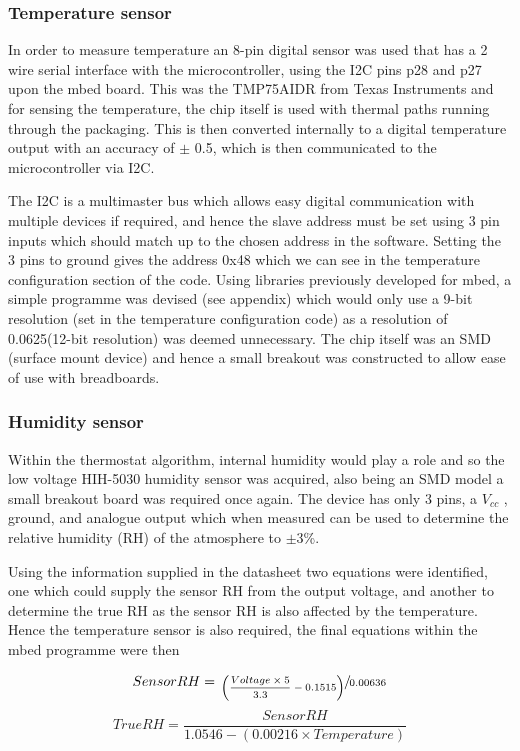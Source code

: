 \documentclass[10.5pt,a4paper,twoside]{report}   %
\begin{document}
\subsubsection{Temperature sensor}
In order to measure temperature an 8-pin digital sensor was used that has a 2 wire serial interface with the microcontroller, using the I2C pins p28 and p27 upon the mbed board. This was the TMP75AIDR from Texas Instruments and for sensing the temperature, the chip itself is used with thermal paths running through the packaging. This is then converted internally to a digital temperature output with an accuracy of $\pm$ 0.5\celsius, which is then communicated to the microcontroller via I2C. 

The I2C is a multimaster bus which allows easy digital communication with multiple devices if required, and hence the slave address must be set using 3 pin inputs which should match up to the chosen address in the software. Setting the 3 pins to ground gives the address {\color{blue} 0x48} which we can see in the temperature configuration section of the code. Using libraries previously developed for mbed, a simple programme was devised (see appendix) which would only use a 9-bit resolution (set in the temperature configuration code) as a resolution of 0.0625\celsius (12-bit resolution) was deemed unnecessary.  The chip itself was an SMD (surface mount device) and hence a small breakout was constructed to allow ease of use with breadboards.


\subsubsection{Humidity sensor}
Within the thermostat algorithm, internal humidity would play a role and so the low voltage HIH-5030 humidity sensor was acquired, also being an SMD model a small breakout board was required once again. The device has only 3 pins, a $V_{cc}$ , ground, and analogue output which when measured can be used to determine the relative humidity (RH) of the atmosphere to $\pm$3\%.

Using the information supplied in the datasheet two equations were identified, one which could supply the sensor RH from the output voltage, and another to determine the true RH as the sensor RH is also affected by the temperature. Hence the temperature sensor is also required, the final equations within the mbed programme were then

\begin{equation}
    SensorRH=\sfrac{\left( \frac{Voltage\times 5}{3.3}-0.1515 \right)}{0.00636} 
\end{equation}	
\begin{equation}	
    TrueRH=\frac{SensorRH}{1.0546 - (0.00216\times Temperature)}  
\end{equation}
\end{document}
